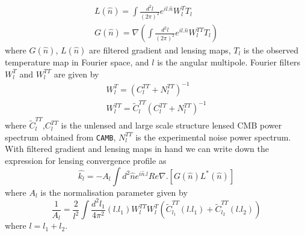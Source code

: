   \begin{eqnarray}
  L(\hat{n}) = \int \frac{d^{2}l}{(2\pi)^{2}} e^{il .\hat{n}} W^{T}_{l} T_{l}\\
  G(\hat{n}) = \nabla (\int\frac{d^{2}l}{(2\pi)^{2}} e^{il .\hat{n}} W^{TT}_{l} T_{l}   )
  \end{eqnarray}
  where $G(\hat{n})$, $L(\hat{n})$ are filtered gradient and lensing maps, $T_{l}$ is the observed temperature map in Fourier space, and $l$ is the angular multipole.  
 Fourier filters $W^{T}_{l}$ and $W^{TT}_{l}$ are given by 
 \begin{eqnarray}
 W^{T}_{l} = (C^{TT}_{l} + N^{TT}_{l})^{-1}\\
 W^{TT}_{l} =  \widetilde{C}^{TT}_{l}(C^{TT}_{l} + N^{TT}_{l})^{-1}
 \label{eqs_filters}
 \end{eqnarray}
 where  $\widetilde{C}^{TT}_{l}$,$C^{TT}_{l} $  is the unlensed and large scale structure lensed CMB power spectrum obtained from \texttt{CAMB}, $ N^{TT}_{l}$ is the experimental noise power spectrum.
 With filtered gradient and lensing maps in hand we can write down the expression for lensing convergence profile as 
 \begin{equation}
 \hat{k_{l}} = -A_{l} \int d^{2} \hat{n} e^{i\hat{n}.l} Re{\nabla .[G(\hat{n}) L^{*}(\hat{n})]}
 \end{equation}
 where $A_{l}$ is the normalisation parameter given by
 \begin{equation}
 \frac{1}{A_{l}} = \frac{2}{l^{2}} \int \frac{d^{2}l_{1}}{4\pi^{2}} (l.l_{1}) W^{TT}_{l} W^{T}_{l} (\tilde{C}^{TT}_{l_{1}}(l.l_{1}) + \tilde{C}^{TT}_{l_{2}}(l.l_{2}))
 \end{equation}
 where $l = l_{1}  + l_{2}$. 
